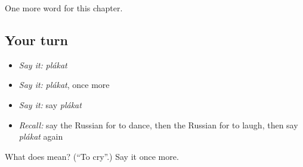 \begin{grammarlens}[title={What you've built}]
One more word for this chapter.
\end{grammarlens}

\subsection*{Your turn}
\begin{itemize}
\raggedright
  \item \emph{Say it:} \emph{plákat}
  \item \emph{Say it:} \emph{plákat}, once more
  \item \emph{Say it:} say \emph{plákat}
  \item \emph{Recall:} say the Russian for to dance, then the Russian for to laugh, then say \emph{plákat} again
\end{itemize}

\begin{tcolorbox}[breakable,colback=teal!4,colframe=teal!35!black,title={Before you move on}]
What does  mean? (\textquotedblleft{}To cry\textquotedblright{}.) Say it once more.
\end{tcolorbox}
